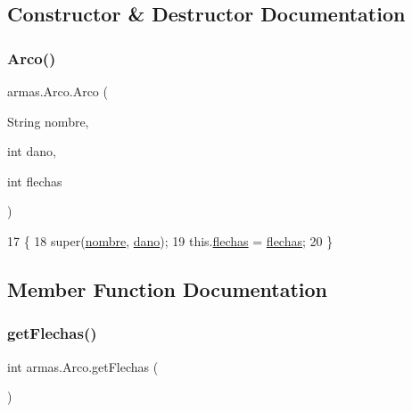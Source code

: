 \subsection{Constructor \& Destructor Documentation}
\mbox{\label{classarmas_1_1_arco_adb6cf1db5096d830f06f387246a9be6a}} 
\subsubsection{\texorpdfstring{Arco()}{Arco()}}
{\footnotesize\ttfamily armas.\+Arco.\+Arco (\begin{DoxyParamCaption}\item[{String}]{nombre,  }\item[{int}]{dano,  }\item[{int}]{flechas }\end{DoxyParamCaption})\hspace{0.3cm}{\ttfamily [inline]}}


\begin{DoxyCode}
17     \{
18         super(\mbox{\hyperlink{classarmas_1_1_arma_abdd717c561a99a3436dbfda8129b5581}{nombre}}, \mbox{\hyperlink{classarmas_1_1_arma_a59396ee4b222360f19c8be08eb7d137b}{dano}});
19         this.\mbox{\hyperlink{classarmas_1_1_arco_a20e5f5a5f70f01f9264a02ff7ee1b657}{flechas}} = \mbox{\hyperlink{classarmas_1_1_arco_a20e5f5a5f70f01f9264a02ff7ee1b657}{flechas}};
20     \}
\end{DoxyCode}


\subsection{Member Function Documentation}
\mbox{\label{classarmas_1_1_arco_a1c85d29bd323b4464da345ccc835c041}} 
\subsubsection{\texorpdfstring{get\+Flechas()}{getFlechas()}}
{\footnotesize\ttfamily int armas.\+Arco.\+get\+Flechas (\begin{DoxyParamCaption}{ }\end{DoxyParamCaption})\hspace{0.3cm}{\ttfamily [inline]}}



